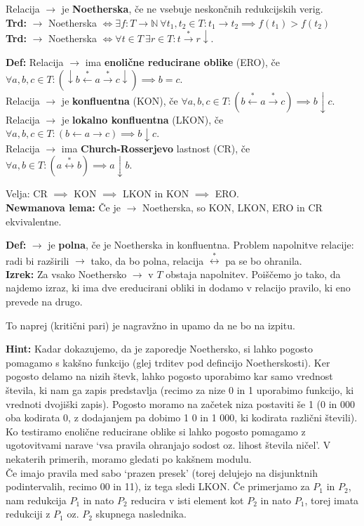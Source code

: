 \documentclass[a4paper,oneside,10pt]{article}
\theoremstyle{definition}
\newcommand{\N}{\ensuremath{\mathbb{N}}}
\newcommand{\lstar}{\overset{*}{\gets}}
\newcommand{\rstar}{\overset{*}{\to}}
\newcommand{\istar}{\overset{*}{\leftrightarrow}}
\newcommand{\red}{\downarrow}
\let\oldtextbf\textbf
\renewcommand{\textbf}[1]{\oldtextbf{\boldmath #1}}
\begin{document}
Relacija $\to$ je \textbf{Noetherska}, če ne vsebuje neskončnih redukcijskih verig. \\
\textbf{Trd:} $\to$ Noetherska $\iff \exists f \colon T \to \N \ \forall t_1, t_2 \in T\colon t_1 \to t_2 \implies f(t_1) > f(t_2)$\\
\textbf{Trd:} $\to$ Noetherska $\iff \forall t \in T\ \exists r \in T\colon t \rstar r\red$.

\textbf{Def:} Relacija $\to$ ima \textbf{enolične reducirane oblike} (ERO), če
$\forall a, b, c \in T\colon (\red b \lstar a \rstar c \red) \implies b=c$. \\
Relacija $\to$ je \textbf{konfluentna} (KON), če $\forall a, b, c \in T\colon
(b \lstar a \rstar c) \implies b \red c$. \\
Relacija $\to$ je \textbf{lokalno konfluentna} (LKON), če $\forall a, b, c \in T\colon (b \gets a \to c) \implies b \red c$. \\
Relacija $\to$ ima \textbf{Church-Rosserjevo} lastnost (CR), če $\forall a, b \in T\colon
(a \istar b) \implies a \red b$.

Velja: CR $\implies$ KON $\implies$ LKON in KON $\implies$ ERO. \\
\textbf{Newmanova lema:} Če je $\to$ Noetherska, so KON, LKON, ERO in CR ekvivalentne.

\textbf{Def: } $\to$ je \textbf{polna}, če je Noetherska in konfluentna.
Problem napolnitve relacije: radi bi razširili $\to$ tako, da bo polna, relacija $\istar$ pa se bo ohranila. \\
\textbf{Izrek: } Za vsako Noethersko $\to$ v $T$ obstaja napolnitev.
Poiščemo jo tako, da najdemo izraz, ki ima dve ereducirani obliki
in dodamo v relacijo pravilo, ki eno prevede na drugo.

To naprej (kritični pari) je nagravžno in upamo da ne bo na izpitu.

\textbf{Hint:} Kadar dokazujemo, da je zaporedje Noethersko, si lahko pogosto pomagamo s kakšno funkcijo (glej trditev pod defincijo Noetherskosti). Ker pogosto delamo na nizih števk, lahko pogosto uporabimo kar samo vrednost števila, ki nam ga zapis predstavlja (recimo za nize 0 in 1 uporabimo funkcijo, ki vrednoti dvojiški zapis). Pogosto moramo na začetek niza postaviti še 1 (0 in 000 oba kodirata 0, z dodajanjem pa dobimo 1 0 in 1 000, ki kodirata različni števili).\\
Ko testiramo enolične reducirane oblike si lahko pogosto pomagamo z ugotovitvami narave `vsa pravila ohranjajo sodost oz. lihost števila ničel'. V nekaterih primerih, moramo gledati po kakšnem modulu.\\
Če imajo pravila med sabo `prazen presek' (torej delujejo na disjunktnih podintervalih, recimo 00 in 11), iz tega sledi LKON. Če primerjamo za $P_1$ in $P_2$, nam redukcija $P_1$ in nato $P_2$ reducira v isti element kot $P_2$ in nato $P_1$, torej imata redukciji z $P_1$ oz. $P_2$ skupnega naslednika.
\end{document}
